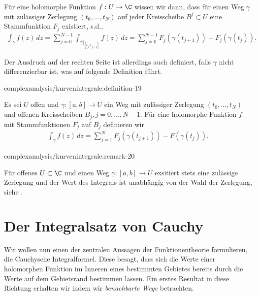 \documentclass[letterpaper,10pt,german]{jupyterBook}
\begin{document}
\par
Für eine holomorphe Funktion \(f:U\to\C\) wissen wir dann, dass für einen Weg \(\gamma\) mit zulässiger Zerlegung \((t_0,\ldots,t_N)\) auf jeder Kreisscheibe \(B^j\subset U\) eine Stammfunktion \(F_j\) existiert, s.d.,
\begin{align*}
\int_\gamma f(z)\, dz= \sum_{j=0}^{N-1} \int_{\gamma\rvert_[t_j,t_{j+1}]} f(z)\, dz=
\sum_{j=0}^{N-1} F_j(\gamma(t_{j+1})) - F_j(\gamma(t_{j})).
\end{align*}
\par
Der Ausdruck auf der rechten Seite ist allerdings auch definiert, falls \(\gamma\) nicht differenzierbar ist, was auf folgende Definition führt.
\begin{definition}{}{complexanalysis/kurvenintegrale:definition-19}



\par
Es sei \(U\) offen und \(\gamma:[a,b]\to U\) ein Weg mit zulässiger Zerlegung \((t_0,\ldots,t_N)\) und offenen Kreisscheiben \(B_j,j=0,\ldots,N-1\). Für eine holomorphe Funktion \(f\) mit Stammfunktionen \(F_j\) auf \(B_j\) definieren wir
\begin{align*}
\int_\gamma f(z)\, dz = \sum_{j=1}^N F_j(\gamma(t_{j+1}))- F(\gamma(t_j)).
\end{align*}\end{definition}
\begin{remark}{}{complexanalysis/kurvenintegrale:remark-20}



\par
Für offenes \(U\subset\C\) und einen Weg \(\gamma:[a,b]\to U\) exsitiert stets eine zulässige Zerlegung und der Wert des Integrals ist unabhängig von der Wahl der Zerlegung, siehe \cite{Nee17}.
\end{remark}


\section{Der Integralsatz von Cauchy}
\label{\detokenize{complexanalysis/cauchyintegral:der-integralsatz-von-cauchy}}\label{\detokenize{complexanalysis/cauchyintegral::doc}}
\par
Wir wollen nun einen der zentralen Aussagen der Funktionentheorie formulieren, die Cauchysche Integralformel.
Diese besagt, dass sich die Werte einer holomorphen Funktion im Inneren eines bestimmten Gebietes bereits durch die Werte auf dem Gebietsrand bestimmen lassen. Ein erstes Resultat in diese Richtung erhalten wir indem wir \emph{benachbarte Wege} betrachten.
\end{document}
